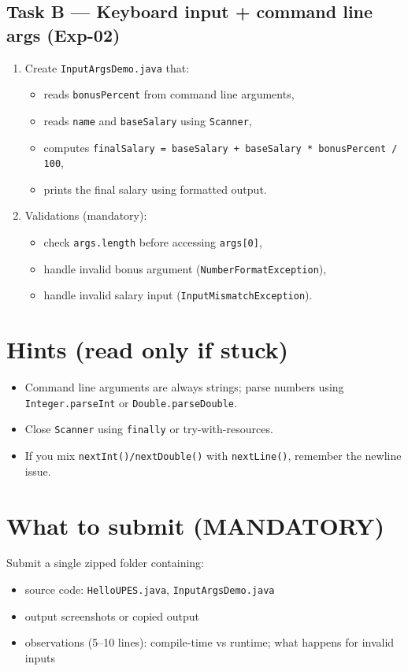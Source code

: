 \documentclass[11pt]{article}
\begin{document}
\subsection{Task B --- Keyboard input + command line args (Exp-02)}
\begin{enumerate}[leftmargin=*]
  \item Create \texttt{InputArgsDemo.java} that:
  \begin{itemize}[leftmargin=*]
    \item reads \texttt{bonusPercent} from command line arguments,
    \item reads \texttt{name} and \texttt{baseSalary} using \texttt{Scanner},
    \item computes \texttt{finalSalary = baseSalary + baseSalary * bonusPercent / 100},
    \item prints the final salary using formatted output.
  \end{itemize}

  \item Validations (mandatory):
  \begin{itemize}[leftmargin=*]
    \item check \texttt{args.length} before accessing \texttt{args[0]},
    \item handle invalid bonus argument (\texttt{NumberFormatException}),
    \item handle invalid salary input (\texttt{InputMismatchException}).
  \end{itemize}
\end{enumerate}

\section{Hints (read only if stuck)}
\begin{itemize}[leftmargin=*]
  \item Command line arguments are always strings; parse numbers using \texttt{Integer.parseInt} or \texttt{Double.parseDouble}.
  \item Close \texttt{Scanner} using \texttt{finally} or try-with-resources.
  \item If you mix \texttt{nextInt()/nextDouble()} with \texttt{nextLine()}, remember the newline issue.
\end{itemize}

\section{What to submit (MANDATORY)}
Submit a single zipped folder containing:
\begin{itemize}[leftmargin=*]
  \item source code: \texttt{HelloUPES.java}, \texttt{InputArgsDemo.java}
  \item output screenshots or copied output
  \item observations (5--10 lines): compile-time vs runtime; what happens for invalid inputs
\end{itemize}

\notesources{\OOPSUnitISources}
\end{document}
